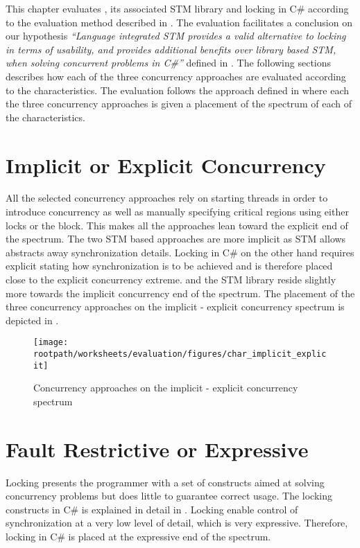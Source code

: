 \makeatletter {}\makeatother
{}
This chapter evaluates \stmname, its associated \ac{STM} library and locking in C\# according to the evaluation method described in . The evaluation facilitates a conclusion on our hypothesis \textit{``Language integrated \ac{STM} provides a valid alternative to locking in terms of usability, and provides additional benefits over library based \ac{STM}, when solving concurrent problems in C\#''} defined in .
\label{chap:evaluation}
The following sections describes how each of the three concurrency approaches are evaluated according to the characteristics. The evaluation follows the approach defined in  where each the three concurrency approaches is given a placement of the spectrum of each of the characteristics.

\section{Implicit or Explicit Concurrency}
All the selected concurrency approaches rely on starting threads in order to introduce concurrency as well as manually specifying critical regions using either locks or the  block. This makes all the approaches lean toward the explicit end of the spectrum. The two \ac{STM} based approaches are more implicit as \ac{STM} allows abstracts away synchronization details. Locking in C\# on the other hand requires explicit stating how synchronization is to be achieved and is therefore placed close to the explicit concurrency extreme. \stmnamesp and the \ac{STM} library reside slightly more towards the implicit concurrency end of the spectrum. The placement of the three concurrency approaches on the implicit - explicit concurrency spectrum is depicted in .

\begin{figure}[htbp]
\centering
 \texttt{[image: \\rootpath/worksheets/evaluation/figures/char\_implicit\_explicit]} 
 \caption{Concurrency approaches on the implicit - explicit concurrency spectrum}
\label{fig:char_implicit_explicit}
\end{figure}

\section{Fault Restrictive or Expressive}
Locking presents the programmer with a set of constructs aimed at solving concurrency problems but does little to guarantee correct usage. The locking constructs in C\# is explained in detail in . Locking enable control of synchronization at a very low level of detail, which is very expressive. Therefore, locking in C\# is placed at the expressive end of the spectrum.

